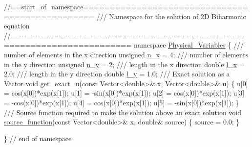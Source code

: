  
\begin{DoxyCodeInclude}
\textcolor{comment}{//==start\_of\_namespace================================================}
\textcolor{comment}{/// Namespace for the solution of 2D Biharmonic equation}
\textcolor{comment}{}\textcolor{comment}{//====================================================================}
\textcolor{keyword}{namespace }\hyperlink{namespacePhysical__Variables}{Physical\_Variables}
\{
 \textcolor{comment}{}
\textcolor{comment}{ /// number of elements in the x direction}
\textcolor{comment}{} \textcolor{keywordtype}{unsigned} \hyperlink{namespacePhysical__Variables_ae766d6695cfb9a8d87be9767b38245ff}{n\_x} = 4;
 \textcolor{comment}{}
\textcolor{comment}{ /// number of elements in the y direction}
\textcolor{comment}{} \textcolor{keywordtype}{unsigned} \hyperlink{namespacePhysical__Variables_a35801b250816fa72ce9023f8738515fa}{n\_y} = 2;
\textcolor{comment}{}
\textcolor{comment}{ /// length in the x direction}
\textcolor{comment}{} \textcolor{keywordtype}{double} \hyperlink{namespacePhysical__Variables_af92161eeeab3e15a31698af80f8d09db}{l\_x} = 2.0;
 \textcolor{comment}{}
\textcolor{comment}{ /// length in the y direction}
\textcolor{comment}{} \textcolor{keywordtype}{double} \hyperlink{namespacePhysical__Variables_a9f73110ebbfe999c6f09ac797793a537}{l\_y} = 1.0;
\textcolor{comment}{}
\textcolor{comment}{ /// Exact solution as a Vector}
\textcolor{comment}{} \textcolor{keywordtype}{void} \hyperlink{namespacePhysical__Variables_af90d0c580c57b1152fd1cc7046055031}{get\_exact\_u}(\textcolor{keyword}{const} Vector<double>& x, Vector<double>& u)
 \{
  u[0] = cos(x[0])*exp(x[1]);
  u[1] = -sin(x[0])*exp(x[1]);
  u[2] = cos(x[0])*exp(x[1]);
  u[3] = -cos(x[0])*exp(x[1]);
  u[4] = cos(x[0])*exp(x[1]);
  u[5] = -sin(x[0])*exp(x[1]);
 \}
\textcolor{comment}{}
\textcolor{comment}{ /// Source function required to make the solution above an exact solution }
\textcolor{comment}{} \textcolor{keywordtype}{void} \hyperlink{namespacePhysical__Variables_ae11027d76c5f512b7db6a1b6d17dc792}{source\_function}(\textcolor{keyword}{const} Vector<double>& x, \textcolor{keywordtype}{double}& source)
 \{
  source = 0.0;
 \}
 
\} \textcolor{comment}{// end of namespace}

\end{DoxyCodeInclude}




